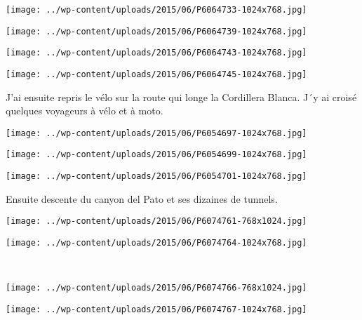 \begin{center} \texttt{[image: ../wp-content/uploads/2015/06/P6064733-1024x768.jpg]} \end{center}
\begin{center} \texttt{[image: ../wp-content/uploads/2015/06/P6064739-1024x768.jpg]} \end{center}
\begin{center} \texttt{[image: ../wp-content/uploads/2015/06/P6064743-1024x768.jpg]} \end{center}
\begin{center} \texttt{[image: ../wp-content/uploads/2015/06/P6064745-1024x768.jpg]} \end{center}

J'ai ensuite repris le vélo sur la route qui longe la Cordillera Blanca. J´y ai croisé quelques voyageurs à vélo et à moto. 
\begin{center} \texttt{[image: ../wp-content/uploads/2015/06/P6054697-1024x768.jpg]} \end{center}
\begin{center} \texttt{[image: ../wp-content/uploads/2015/06/P6054699-1024x768.jpg]} \end{center}
\vfill
\begin{center} \texttt{[image: ../wp-content/uploads/2015/06/P6054701-1024x768.jpg]} \end{center}
\vspace{-\topsep}
\vspace{-0.75mm}
\pagebreak
Ensuite descente du canyon del Pato et ses dizaines de tunnels. 
\begin{center} \texttt{[image: ../wp-content/uploads/2015/06/P6074761-768x1024.jpg]} \end{center}
\begin{center} \texttt{[image: ../wp-content/uploads/2015/06/P6074764-1024x768.jpg]} \end{center}
\vspace{-\topsep}
\vspace{-1.25mm}
\pagebreak
~
\begin{center} \texttt{[image: ../wp-content/uploads/2015/06/P6074766-768x1024.jpg]} \end{center}
\begin{center} \texttt{[image: ../wp-content/uploads/2015/06/P6074767-1024x768.jpg]} \end{center}
